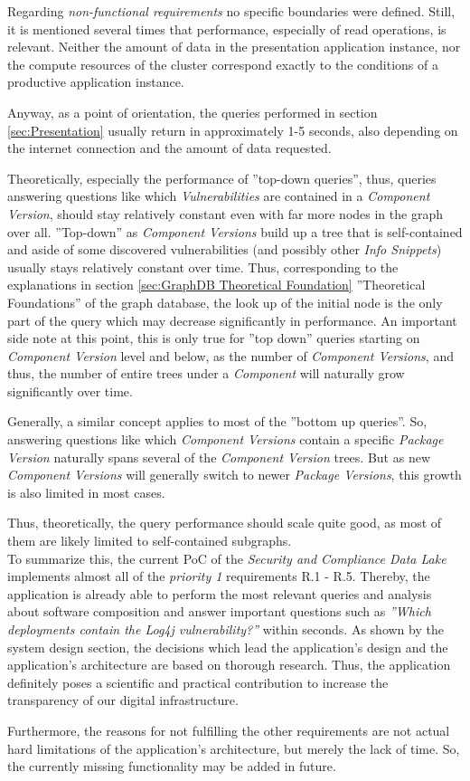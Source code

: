 Regarding \emph{non-functional requirements} no specific boundaries were defined. Still, it is mentioned several times that performance, especially of read operations, is relevant. Neither the amount of data in the presentation application instance, nor the compute resources of the cluster correspond exactly to the conditions of a productive application instance.\par
Anyway, as a point of orientation, the queries performed in section \ref{sec:Presentation} usually return in approximately 1-5 seconds, also depending on the internet connection and the amount of data requested.\par 
Theoretically, especially the performance of ''top-down queries'', thus, queries answering questions like which \emph{Vulnerabilities} are contained in a \emph{Component Version}, should stay relatively constant even with far more nodes in the graph over all. ''Top-down'' as \emph{Component Versions} build up a tree that is self-contained and aside of some discovered vulnerabilities (and possibly other \emph{Info Snippets}) usually stays relatively constant over time. Thus, corresponding to the explanations in section \ref{sec:GraphDB Theoretical Foundation} ''Theoretical Foundations'' of the graph database, the look up of the initial node is the only part of the query which may decrease significantly in performance. An important side note at this point, this is only true for ''top down'' queries starting on \emph{Component Version} level and below, as the number of \emph{Component Versions}, and thus, the number of entire trees under a \emph{Component} will naturally grow significantly over time.\par
Generally, a similar concept applies to most of the ''bottom up queries''. So, answering questions like which \emph{Component Versions} contain a specific \emph{Package Version} naturally spans several of the \emph{Component Version} trees. But as new \emph{Component Versions} will generally switch to newer \emph{Package Versions}, this growth is also limited in most cases.\par
Thus, theoretically, the query performance should scale quite good, as most of them are likely limited to self-contained subgraphs.\\

To summarize this, the current PoC of the \emph{Security and Compliance Data Lake} implements almost all of the \emph{priority 1} requirements R.1 - R.5. Thereby, the application is already able to perform the most relevant queries and analysis about software composition and answer important questions such as \emph{''Which deployments contain the Log4j vulnerability?''} within seconds. As shown by the system design section, the decisions which lead the application's design and the application's architecture are based on thorough research. Thus, the application definitely poses a scientific and practical contribution to increase the transparency of our digital infrastructure.\par
Furthermore, the reasons for not fulfilling the other requirements are not actual hard limitations of the application's architecture, but merely the lack of time. So, the currently missing functionality may be added in future.

